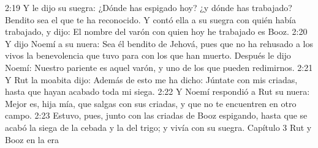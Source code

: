 2:19 Y le dijo su suegra: ¿Dónde has espigado hoy? ¿y dónde has trabajado? Bendito sea el que te ha reconocido. Y contó ella a su suegra con quién había trabajado, y dijo: El nombre del varón con quien hoy he trabajado es Booz.  
2:20 Y dijo Noemí a su nuera: Sea él bendito de Jehová, pues que no ha rehusado a los vivos la benevolencia que tuvo para con los que han muerto. Después le dijo Noemí: Nuestro pariente es aquel varón, y uno de los que pueden redimirnos.  
2:21 Y Rut la moabita dijo: Además de esto me ha dicho: Júntate con mis criadas, hasta que hayan acabado toda mi siega.  
2:22 Y Noemí respondió a Rut su nuera: Mejor es, hija mía, que salgas con sus criadas, y que no te encuentren en otro campo.  
2:23 Estuvo, pues, junto con las criadas de Booz espigando, hasta que se acabó la siega de la cebada y la del trigo; y vivía con su suegra.  
Capítulo 3
Rut y Booz en la era  

